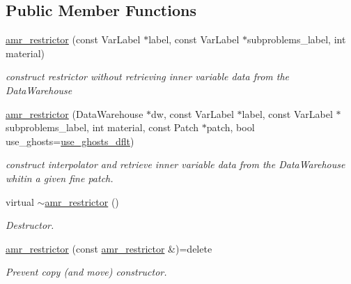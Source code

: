 \subsection*{Public Member Functions}
\begin{DoxyCompactItemize}
\item 
\hyperlink{classUintah_1_1PhaseField_1_1detail_1_1amr__restrictor_3_01ScalarField_3_01T_01_4_00_01Problem_05760ee5d1d3adcc969b3f56f71e72acb_adc68b10aa0ea3669167e75e848315f69}{amr\+\_\+restrictor} (const Var\+Label $\ast$label, const Var\+Label $\ast$subproblems\+\_\+label, int material)
\begin{DoxyCompactList}\small\item\em construct restrictor without retrieving inner variable data from the Data\+Warehouse \end{DoxyCompactList}\item 
\hyperlink{classUintah_1_1PhaseField_1_1detail_1_1amr__restrictor_3_01ScalarField_3_01T_01_4_00_01Problem_05760ee5d1d3adcc969b3f56f71e72acb_aecb2d88122a1adaae4560445ee13eaed}{amr\+\_\+restrictor} (Data\+Warehouse $\ast$dw, const Var\+Label $\ast$label, const Var\+Label $\ast$subproblems\+\_\+label, int material, const Patch $\ast$patch, bool use\+\_\+ghosts=\hyperlink{classUintah_1_1PhaseField_1_1detail_1_1amr__restrictor_3_01ScalarField_3_01T_01_4_00_01Problem_05760ee5d1d3adcc969b3f56f71e72acb_a1579c120a731bc2c5e5d53a3e3db51dc}{use\+\_\+ghosts\+\_\+dflt})
\begin{DoxyCompactList}\small\item\em construct interpolator and retrieve inner variable data from the Data\+Warehouse whitin a given fine patch. \end{DoxyCompactList}\item 
virtual \hyperlink{classUintah_1_1PhaseField_1_1detail_1_1amr__restrictor_3_01ScalarField_3_01T_01_4_00_01Problem_05760ee5d1d3adcc969b3f56f71e72acb_a2b82f57cc6e6034d4ce47be7d9df29f7}{$\sim$amr\+\_\+restrictor} ()
\begin{DoxyCompactList}\small\item\em Destructor. \end{DoxyCompactList}\item 
\hyperlink{classUintah_1_1PhaseField_1_1detail_1_1amr__restrictor_3_01ScalarField_3_01T_01_4_00_01Problem_05760ee5d1d3adcc969b3f56f71e72acb_a9dd4c58f76077456452653c0cf793955}{amr\+\_\+restrictor} (const \hyperlink{classUintah_1_1PhaseField_1_1detail_1_1amr__restrictor}{amr\+\_\+restrictor} \&)=delete
\begin{DoxyCompactList}\small\item\em Prevent copy (and move) constructor. \end{DoxyCompactList}\item 

\end{DoxyCompactItemize}
